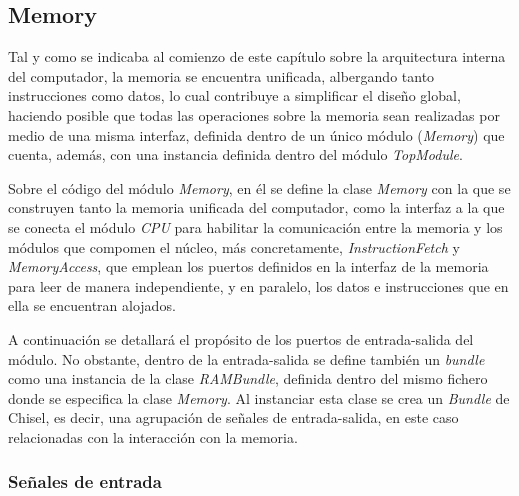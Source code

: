 \subsection{Memory}

Tal y como se indicaba al comienzo de este capítulo sobre la arquitectura interna del computador, la memoria se encuentra unificada, albergando tanto instrucciones como datos, lo cual contribuye a simplificar el diseño global, haciendo posible que todas las operaciones sobre la memoria sean realizadas por medio de una misma interfaz, definida dentro de un único módulo (\textit{Memory}) que cuenta, además, con una instancia definida dentro del módulo \textit{TopModule}.

Sobre el código del módulo \textit{Memory}, en él se define la clase \textit{Memory} con la que se construyen tanto la memoria unificada del computador, como la interfaz a la que se conecta el módulo \textit{CPU} para habilitar la comunicación entre la memoria y los módulos que compomen el núcleo, más concretamente, \textit{InstructionFetch} y \textit{MemoryAccess}, que emplean los puertos definidos en la interfaz de la memoria para leer de manera independiente, y en paralelo, los datos e instrucciones que en ella se encuentran alojados.

A continuación se detallará el propósito de los puertos de entrada-salida del módulo. No obstante, dentro de la entrada-salida se define también un \textit{bundle} como una instancia de la clase \textit{RAMBundle}, definida dentro del mismo fichero donde se especifica la clase \textit{Memory}. Al instanciar esta clase se crea un \textit{Bundle} de Chisel, es decir, una agrupación de señales de entrada-salida, en este caso relacionadas con la interacción con la memoria.

\subsubsection{Señales de entrada}

